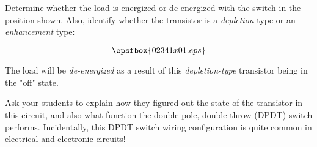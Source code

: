 

Determine whether the load is energized or de-energized with the switch in the position shown.  Also, identify whether the transistor is a {\it depletion} type or an {\it enhancement} type:

$$\epsfbox{02341x01.eps}$$







The load will be {\it de-energized} as a result of this {\it depletion-type} transistor being in the "off" state.







Ask your students to explain how they figured out the state of the transistor in this circuit, and also what function the double-pole, double-throw (DPDT) switch performs.  Incidentally, this DPDT switch wiring configuration is quite common in electrical and electronic circuits!




